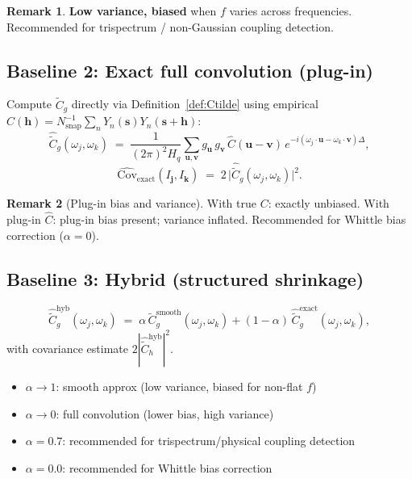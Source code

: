 \documentclass[12pt]{article}
\theoremstyle{definition}
\newtheorem{remark}{Remark}
\begin{document}
\begin{remark}
\textbf{Low variance, biased} when $f$ varies across frequencies.
Recommended for trispectrum / non-Gaussian coupling detection.
\end{remark}

\subsection{Baseline 2: Exact full convolution (plug-in)}

Compute $\tilde{C}_g$ directly via Definition~\ref{def:Ctilde}
using empirical $\hat{C}(\mathbf{h})=N_{\mathrm{snap}}^{-1}\sum_n Y_n(\mathbf{s})Y_n(\mathbf{s}+\mathbf{h})$:
\[
  \hat{\tilde{C}}_g(\omega_j,\omega_k)
  \;=\; \frac{1}{(2\pi)^2 H_q}\sum_{\mathbf{u},\mathbf{v}}
    g_{\mathbf{u}}\,g_{\mathbf{v}}\,\hat{C}(\mathbf{u}-\mathbf{v})\,
    e^{-i(\omega_j\cdot\mathbf{u}-\omega_k\cdot\mathbf{v})\Delta},
\]
\[
\boxed{
  \widehat{\mathrm{Cov}}_{\mathrm{exact}}(I_{\mathbf{j}},I_{\mathbf{k}})
  \;=\; 2\,\bigl|\hat{\tilde{C}}_g(\omega_j,\omega_k)\bigr|^2.
}
\]

\begin{remark}[Plug-in bias and variance]
With true $C$: exactly unbiased.
With plug-in $\hat{C}$: plug-in bias present; variance inflated.
Recommended for Whittle bias correction ($\alpha=0$).
\end{remark}

\subsection{Baseline 3: Hybrid (structured shrinkage)}

\[
\boxed{
  \hat{\tilde{C}}_g^{\mathrm{hyb}}(\omega_j,\omega_k)
  \;=\; \alpha\,\tilde{C}_g^{\mathrm{smooth}}(\omega_j,\omega_k)
       + (1-\alpha)\,\hat{\tilde{C}}_g^{\mathrm{exact}}(\omega_j,\omega_k),
}
\]
with covariance estimate $2|\hat{\tilde{C}}_h^{\mathrm{hyb}}|^2$.

\begin{itemize}
  \item $\alpha \to 1$: smooth approx (low variance, biased for non-flat $f$)
  \item $\alpha \to 0$: full convolution (lower bias, high variance)
  \item $\alpha = 0.7$: recommended for trispectrum/physical coupling detection
  \item $\alpha = 0.0$: recommended for Whittle bias correction
\end{itemize}
\end{document}
